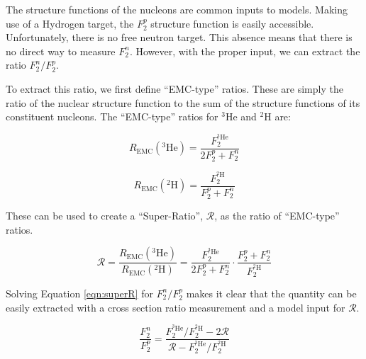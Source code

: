 \label{sec:F2ratio}
The structure functions of the nucleons are common inputs to models. Making use of a Hydrogen target, the $F_2^p$ structure function is easily accessible. Unfortunately, there is no free neutron target. This absence means that there is no direct way to measure $F_2^n$. However, with the proper input, we can extract the ratio $F_2^n/F_2^p$.

To extract this ratio, we first define ``EMC-type'' ratios. These are simply the ratio of the nuclear structure function to the sum of the structure functions of its constituent nucleons. The ``EMC-type'' ratios for $^3$He and $^2$H are:

\begin{equation}
	R_{\text{EMC}}\left(^3\text{He}\right) = \frac{F_2^{^3\text{He}}}{2F_2^p + F_2^n}
\end{equation}

\begin{equation}
	R_{\text{EMC}}\left(^2\text{H}\right) = \frac{F_2^{^2\text{H}}}{F_2^p + F_2^n}
\end{equation}

These can be used to create a ``Super-Ratio'', $\mathcal{R}$, as the ratio of ``EMC-type'' ratios.

\begin{equation}
	\mathcal{R} = \frac{R_{\text{EMC}}\left(^3\text{He}\right)}{R_{\text{EMC}}\left(^2\text{H}\right)} = \frac{F_2^{^3\text{He}}}{2F_2^p + F_2^n} \cdot \frac{F_2^p + F_2^n}{F_2^{^2\text{H}}}
	\label{eqn:superR}
\end{equation}

Solving Equation \ref{eqn:superR} for $F_2^n/F_2^p$ makes it clear that the quantity can be easily extracted with a cross section ratio measurement and a model input for $\mathcal{R}$.

\begin{equation}
	\frac{F_2^n}{F_2^p} = \frac{F_2^{^3\text{He}}/F_2^{^2\text{H}} - 2\mathcal{R}}{\mathcal{R} - F_2^{^3\text{He}}/F_2^{^2\text{H}}}
\end{equation}